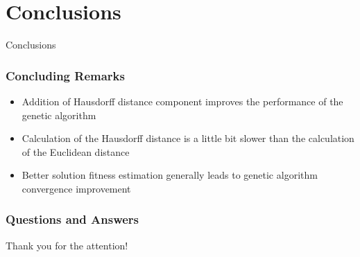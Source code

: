 \documentclass{beamer}
\begin{document}
\section{Conclusions}

\begin{frame}
\center \huge{Conclusions}
\end{frame}

\begin{frame}
\frametitle{Concluding Remarks}
\begin{itemize}
  \item Addition of Hausdorff distance component improves the performance of the genetic algorithm
  \item Calculation of the Hausdorff distance is a little bit slower than the calculation of the Euclidean distance
  \item Better solution fitness estimation generally leads to genetic algorithm convergence improvement
\end{itemize}
\end{frame}

\begin{frame}
\frametitle{Questions and Answers}
\center \huge{Thank you for the attention!}
\end{frame}
\end{document}
